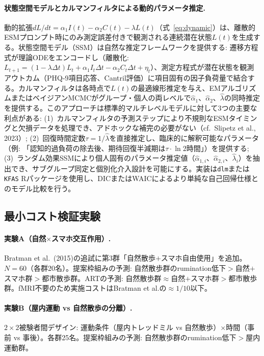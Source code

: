 \documentclass[a4paper,11pt,titlepage]{article}
\begin{document}
\paragraph{状態空間モデルとカルマンフィルタによる動的パラメータ推定.}
動的拡張$dL/dt = \alpha_1 I(t) - \alpha_2 C(t) - \lambda L(t)$（式~\ref{eq:dynamic}）は、離散的ESMプロンプト時にのみ測定誤差付きで観測される連続潜在状態$L(t)$を生成する。状態空間モデル（SSM）は自然な推定フレームワークを提供する: 遷移方程式が理論ODEをエンコードし（離散化: $L_{t+1} = (1 - \lambda \Delta t) L_t + \alpha_1 I_t \Delta t - \alpha_2 C_t \Delta t + \eta_t$）、測定方程式が潜在状態を観測アウトカム（PHQ-9項目応答、Cantril評価）に項目固有の因子負荷量で結合する。カルマンフィルタは各時点で$L(t)$の最適線形推定を与え、EMアルゴリズムまたはベイジアンMCMCがグループ・個人の両レベルで$\hat{\alpha}_1$、$\hat{\alpha}_2$、$\hat{\lambda}$の同時推定を提供する。このアプローチは標準的マルチレベルモデルに対して3つの主要な利点がある: (1)~カルマンフィルタの予測ステップにより不規則なESMタイミングと欠損データを処理でき、アドホックな補完の必要がない（cf.\ Slipetz et al., 2023）; (2)~回復時間定数$\tau = 1/\hat{\lambda}$を直接推定し、臨床的に解釈可能なパラメータ（例: 「認知的過負荷の除去後、期待回復半減期は$\tau \cdot \ln 2$時間」）を提供する; (3)~ランダム効果SSMにより個人固有のパラメータ推定値（$\hat{\alpha}_{1,i}$、$\hat{\alpha}_{2,i}$、$\hat{\lambda}_i$）を抽出でき、サブグループ同定と個別化介入設計を可能にする。実装は\texttt{dlm}または\texttt{KFAS} Rパッケージを使用し、DICまたはWAICによるより単純な自己回帰仕様とのモデル比較を行う。


\subsection{最小コスト検証実験}

\paragraph{実験A（自然$\times$スマホ交互作用）.}
Bratman et al.~(2015)の追試に第3群「自然散歩$+$スマホ自由使用」を追加。$N = 60$（各群20名）。提案枠組みの予測: 自然散歩群のrumination低下$>$自然$+$スマホ群$>$都市散歩群。ARTの予測: 自然散歩群$\approx$自然$+$スマホ群$>$都市散歩群。fMRI不要のため実施コストはBratman et al.の$\approx 1/10$以下。

\paragraph{実験B（屋内運動 vs 自然散歩の分離）.}
$2 \times 2$被験者間デザイン: 運動条件（屋内トレッドミル vs 自然散歩）$\times$時間（事前 vs 事後）。各群25名。提案枠組みの予測: 自然散歩群のrumination低下$>$屋内運動群。
\end{document}
